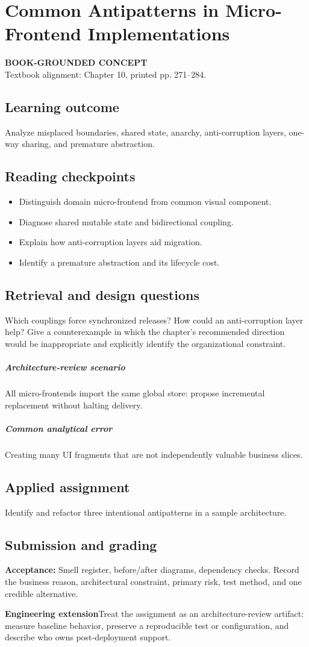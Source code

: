 \documentclass[11pt,letterpaper,oneside]{report}
\newcommand{\based}[1]{\begin{sourcebox}\textbf{BOOK-GROUNDED CONCEPT}\\#1\end{sourcebox}}
\newcommand{\criterion}[1]{\textbf{Acceptance:} #1}
\begin{document}
\chapter{Common Antipatterns in Micro-Frontend Implementations}
\based{Textbook alignment: Chapter 10, printed pp. 271--284.}
\section{Learning outcome}
Analyze misplaced boundaries, shared state, anarchy, anti-corruption layers, one-way sharing, and premature abstraction.
\section{Reading checkpoints}
\begin{itemize}\item Distinguish domain micro-frontend from common visual component.
\item Diagnose shared mutable state and bidirectional coupling.
\item Explain how anti-corruption layers aid migration.
\item Identify a premature abstraction and its lifecycle cost.
\end{itemize}
\section{Retrieval and design questions}
Which couplings force synchronized releases? How could an anti-corruption layer help? Give a counterexample in which the chapter's recommended direction would be inappropriate and explicitly identify the organizational constraint.
\paragraph{Architecture-review scenario} All micro-frontends import the same global store: propose incremental replacement without halting delivery.
\paragraph{Common analytical error} Creating many UI fragments that are not independently valuable business slices.
\section{Applied assignment}
Identify and refactor three intentional antipatterns in a sample architecture.
\section{Submission and grading}
\criterion{Smell register, before/after diagrams, dependency checks. Record the business reason, architectural constraint, primary risk, test method, and one credible alternative.}
\begin{engineerbox}\textbf{Engineering extension}\newline Treat the assignment as an architecture-review artifact: measure baseline behavior, preserve a reproducible test or configuration, and describe who owns post-deployment support.\end{engineerbox}
\end{document}
